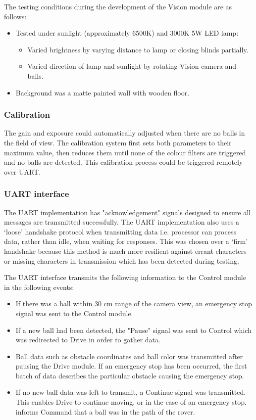 \documentclass[11pt, a4paper]{article}
\begin{document}
The testing conditions during the development of the Vision module are as follows:
\begin{itemize}
    \item Tested under sunlight (approximately 6500K) and 3000K 5W LED lamp:
    \begin{itemize}
        \item Varied brightness by varying distance to lamp or closing blinds partially.
        \item Varied direction of lamp and sunlight by rotating Vision camera and balls.
    \end{itemize}
    \item Background was a matte painted wall with wooden floor.
\end{itemize} 

\subsubsection{Calibration}

The gain and exposure could automatically adjusted when there are no balls in the field of view. The calibration system first sets both parameters to their maximum value, then reduces them until none of the colour filters are triggered and no balls are detected. This calibration process could be triggered remotely over UART.

\subsubsection{UART interface}

The UART implementation has "acknowledgement" signals designed to ensure all messages are transmitted successfully. The UART implementation also uses a ‘loose’ handshake protocol when transmitting data i.e. processor can process data, rather than idle, when waiting for responses. This was chosen over a ‘firm’ handshake because this method is much more resilient against errant characters or missing characters in transmission which has been detected during testing.



The UART interface transmits the following information to the Control module in the following events:
\begin{itemize}
    \item If there was a ball within 30 cm range of the camera view, an emergency stop signal was sent to the Control module.
    \item If a new ball had been detected, the "Pause" signal was sent to Control which was redirected to Drive in order to gather data.
    \item Ball data such as obstacle coordinates and ball color was transmitted after pausing the Drive module. If an emergency stop has been occurred, the first batch of data describes the particular obstacle causing the emergency stop.
    \item If no new ball data was left to transmit, a Continue signal was transmitted. This enables Drive to continue moving, or in the case of an emergency stop, informs Command that a ball was in the path of the rover.
\end{itemize}
\end{document}
